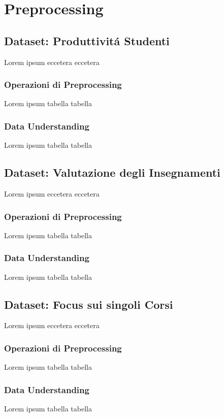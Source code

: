 \chapter{Preprocessing}

\section{Dataset: Produttivit\'a Studenti}
	Lorem ipsum eccetera eccetera  

	\subsection{Operazioni di Preprocessing}
		Lorem ipsum tabella tabella

	\subsection{Data Understanding}
		Lorem ipsum tabella tabella
	
\section{Dataset: Valutazione degli Insegnamenti}
	Lorem ipsum eccetera eccetera  

	\subsection{Operazioni di Preprocessing}
		Lorem ipsum tabella tabella

	\subsection{Data Understanding}
		Lorem ipsum tabella tabella

\section{Dataset: Focus sui singoli Corsi}
	Lorem ipsum eccetera eccetera  

	\subsection{Operazioni di Preprocessing}
		Lorem ipsum tabella tabella

	\subsection{Data Understanding}
		Lorem ipsum tabella tabella
